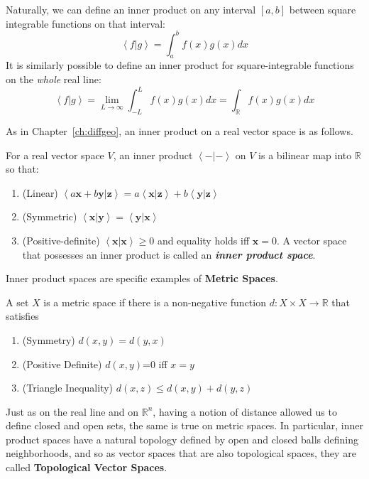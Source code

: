 	Naturally, we can define an inner product on any interval $[a,b]$ between square integrable functions on that interval:
	\begin{equation}
		\left< f | g\right> = \int_a^b f(x)g(x) dx
	\end{equation}
	 It is similarly possible to define an inner product for square-integrable functions on the \emph{whole} real line:
	\begin{equation}
		\left< f | g \right> = \lim_{L \rightarrow \infty} \int_{-L}^L f(x) g(x) dx = \int_{\mathbb R} f(x) g(x) dx
	\end{equation}
	
	As in Chapter~\ref{ch:diffgeo}, an inner product on a real vector space is as follows. 
	\begin{defn}
		For a real vector space $V$, an inner product $\left<-|-\right>$ on $V$ is a bilinear map into $\mathbb R$ so that:
		\begin{enumerate}
			\item (Linear) $\left<a \mathbf x + b \mathbf y | \mathbf z\right> = a \left< \mathbf x | \mathbf z \right> + b \left< \mathbf y | \mathbf z \right>$
			\item (Symmetric) $\left<\mathbf x | \mathbf y\right> = \left< \mathbf y | \mathbf x\right>$
			\item (Positive-definite) $\left< \mathbf x | \mathbf x \right> \geq 0$ and equality holds iff $\mathbf x = 0$. A vector space that possesses an inner product is called an \emph{\textbf{inner product space}}.
		\end{enumerate}
	\end{defn}
	
	Inner product spaces are specific examples of \textbf{Metric Spaces}. 
	\begin{defn}
		A set $X$ is a metric space if there is a non-negative function $d:X\times X \rightarrow \mathbb R$ that satisfies
		\begin{enumerate}
			\item (Symmetry) $d(x,y)=d(y,x)$
			\item (Positive Definite) $d(x,y)$=0 iff $x=y$
			\item (Triangle Inequality) $d(x,z) \leq d(x,y) + d(y,z)$
		\end{enumerate}
	\end{defn}
	Just as on the real line and on $\mathbb{R}^n$, having a notion of distance allowed us to define closed and open sets, the same is true on metric spaces. In particular, inner product spaces have a natural topology defined by open and closed balls defining neighborhoods, and so as vector spaces that are also topological spaces, they are called \textbf{Topological Vector Spaces}.\\
	
